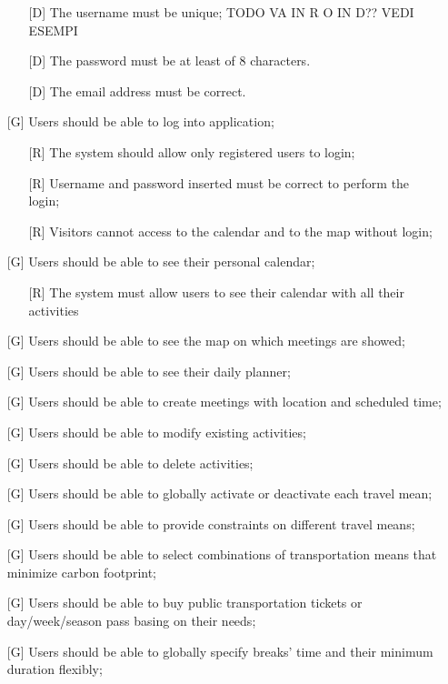 \documentclass[12pt,titlepage]{article}
\begin{document}
\begin{itemize}
\begin{itemize}
\item[{[D\ped{1}]}] The username must be unique; TODO VA IN R O IN D?? VEDI ESEMPI 
\item[{[D\ped{2}]}] The password must be at least of 8 characters.
\item[{[D\ped{3}]}] The email address must be correct.
\end{itemize}
\item [{[G\ped{2}]}]		Users should be able to log into application;
\begin{itemize}
\item[{[R\ped{1}]}] The system should allow only registered users to login;
\item[{[R\ped{2}]}] Username and password inserted must be correct to perform the login;
\item[{[R\ped{3}]}] Visitors cannot access to the calendar and to the map without login;
\end{itemize}
\item [{[G\ped{3}]}]		Users should be able to see their personal calendar;
\begin{itemize}
\item[{[R\ped{1}]}] The system must allow users to see their calendar with all their activities
\end{itemize}
\item [{[G\ped{4}]}]		Users should be able to see the map on which meetings are showed;
\item [{[G\ped{5}]}]		Users should be able to see their daily planner;
\item [{[G\ped{6}]}]		Users should be able to create meetings with location and scheduled time;
\item [{[G\ped{7}]}]		Users should be able to modify existing activities;
\item [{[G\ped{8}]}]		Users should be able to delete activities;
\item [{[G\ped{9}]}]		Users should be able to globally activate or deactivate each travel mean;
\item [{[G\ped{10}]}]		Users should be able to provide constraints on different travel means;
\item [{[G\ped{11}]}]		Users should be able to select combinations of transportation means that minimize carbon footprint;
\item [{[G\ped{12}]}]		Users should be able to buy public transportation tickets or day/week/season pass basing on their needs;
\item [{[G\ped{13}]}]		Users should be able to globally specify breaks' time and their minimum duration flexibly;

\end{itemize}
\end{document}
